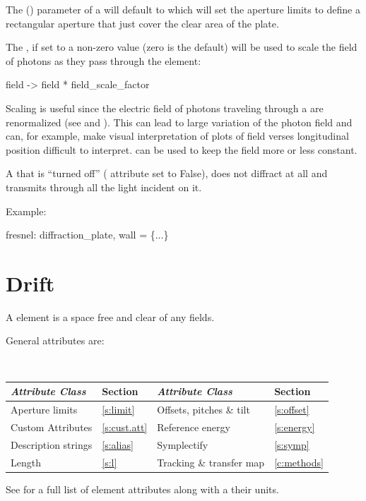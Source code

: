 The  () parameter of a
 will default to  which will set the
aperture limits to define a rectangular aperture that just cover the
clear area of the plate.

The , if set to a non-zero value (zero is the
default) will be used to scale the field of photons as they pass through
the  element:
\begin{example}
  field -> field * field_scale_factor
\end{example}
Scaling is useful since the electric field of photons traveling through a
 are renormalized (see  and
). This can lead to large variation of the photon field and
can, for example, make visual interpretation of plots of field verses
longitudinal position difficult to interpret. 
can be used to keep the field more or less constant.

A  that is ``turned off'' ( attribute
set to False), does not diffract at all and transmits through all
the light incident on it.

Example:
\begin{example}
  fresnel: diffraction_plate, wall = \{...\}
\end{example}

\newpage

\section{Drift}
\label{s:drift}

A  element is a space free and clear of any fields.

General  attributes are:
\begin{center}
\tt
\begin{tabular}{llll} \toprule
  {\sl Attribute Class}      & Section          & {\sl Attribute Class}      & Section         \\ \midrule
  Aperture limits            & \ref{s:limit}    & Offsets, pitches \& tilt   & \ref{s:offset}  \\
  Custom Attributes          & \ref{s:cust.att} & Reference energy           & \ref{s:energy}  \\ 
  Description strings        & \ref{s:alias}    & Symplectify                & \ref{s:symp}    \\ 
  Length                     & \ref{s:l}        & Tracking \& transfer map   & \ref{c:methods} \\ 
  \bottomrule
\end{tabular}
\end{center}
\toffset
See  for a full list of element attributes along with a their units.

